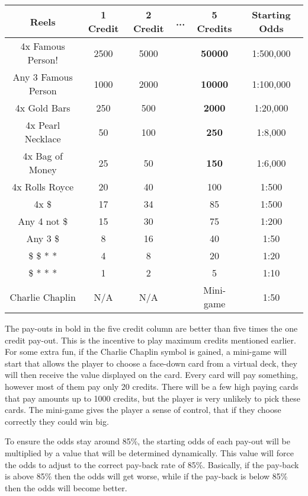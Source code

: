 \begin{center}
\begin{tabular}{| c | c | c | c | c | c |}
  \hline
  Reels                   & 1 Credit  & 2 Credit & ... & 5 Credits & Starting Odds \\ \hline
  4x Famous Person!       & 2500 & 5000 & & {\bf \large 50000} & 1:500,000 \\ \hline
  Any 3 Famous Person     & 1000 & 2000 & & {\bf 10000} & 1:100,000 \\ \hline
  4x Gold Bars            & 250 & 500 & & {\bf 2000} & 1:20,000 \\ \hline
  4x Pearl Necklace       & 50 & 100 & & {\bf 250} & 1:8,000 \\ \hline
  4x Bag of Money         & 25 & 50 & & {\bf 150} & 1:6,000 \\ \hline
  4x Rolls Royce          & 20 & 40 & & 100 & 1:500 \\ \hline
  4x \$                   & 17 & 34 & & 85 & 1:500 \\ \hline
  Any 4 not \$            & 15 & 30 & & 75 & 1:200 \\ \hline
  Any 3 \$                & 8 & 16 & & 40 & 1:50 \\ \hline
  \$ \$ * *               & 4 & 8 & & 20 & 1:20 \\ \hline
  \$ * * *                & 1 & 2 & & 5 & 1:10 \\ \hline
  Charlie Chaplin         & N/A & N/A & & Mini-game & 1:50 \\ \hline
\end{tabular}
\end{center}

The pay-outs in bold in the five credit column are better than five times the one credit pay-out.  This is the incentive to play maximum credits mentioned earlier.  For some extra fun, if the Charlie Chaplin symbol is gained, a mini-game will start that allows the player to choose a face-down card from a virtual deck, they will then receive the value displayed on the card.  Every card will pay something, however most of them pay only 20 credits.  There will be a few high paying cards that pay amounts up to 1000 credits, but the player is very unlikely to pick these cards.  The mini-game gives the player a sense of control, that if they choose correctly they could win big.

To ensure the odds stay around 85\%, the starting odds of each pay-out will be multiplied by a value that will be determined dynamically.  This value will force the odds to adjust to the correct pay-back rate of 85\%.  Basically, if the pay-back is above 85\% then the odds will get worse, while if the pay-back is below 85\% then the odds will become better.

